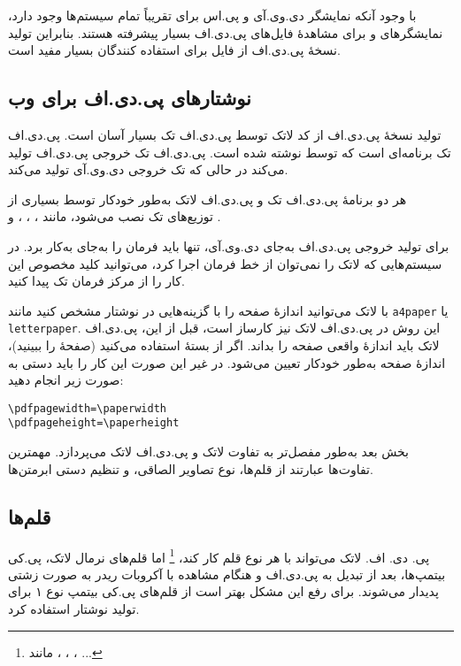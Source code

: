 {با وجود آنکه نمایشگر دی.وی.آی و پی.اس برای تقریباً تمام سیستم‌ها وجود دارد، نمایشگر\-های 
 و   برای مشاهدهٔ فایل‌های پی.دی.اف بسیار پیشرفته هستند. بنابر\-این تولید نسخهٔ پی.دی.اف از فایل برای استفاده کنندگان بسیار مفید است.
\subsection{نوشتارهای پی.دی.اف برای وب}

تولید نسخهٔ پی.دی.اف از کد لاتک توسط پی.دی.اف تک بسیار آسان است. پی.دی.اف تک برنامه‌ای است که توسط  نوشته شده است. پی.دی.اف تک خروجی پی.دی.اف تولید می‌کند در حالی که تک خروجی دی.وی.آی تولید می‌کند. 

هر دو برنامهٔ پی.دی.اف تک و پی.دی.اف لاتک به‌طور خودکار توسط بسیاری از توزیع‌های تک نصب می‌شود، مانند  ، ، 
،  و .

برای تولید خروجی پی.دی.اف به‌جای دی.وی.آی، تنها باید فرمان   را به‌جای  به‌کار برد. 
در سیستم‌هایی که لاتک را نمی‌توان از خط فرمان اجرا کرد، می‌توانید کلید مخصوص این کار را از مرکز فرمان تک پیدا کنید.

با لاتک می‌توانید اندازهٔ صفحه را با گزینه‌هایی در نوشتار‌ مشخص کنید مانند  \texttt{a4paper} یا \texttt{letterpaper}. 
این روش در پی.دی.اف لاتک نیز کارساز است، قبل از این، پی.دی.اف لاتک باید اندازهٔ واقعی صفحه را بداند.
اگر از بستهٔ  استفاده می‌کنید (صفحهٔ 
\pageref{ssec:pdfhyperref} را ببینید)، اندازهٔ صفحه به‌طور خودکار تعیین می‌شود. در غیر این صورت این کار را باید دستی به صورت زیر انجام دهید:
\begin{code}
\begin{verbatim}
\pdfpagewidth=\paperwidth
\pdfpageheight=\paperheight
\end{verbatim}
\end{code}

بخش بعد به‌طور مفصل‌تر به تفاوت لاتک و پی.دی.اف لاتک می‌پردازد. مهمترین تفاوت‌ها عبارتند از قلم‌ها، نوع تصاویر الصاقی، و تنظیم دستی ابرمتن‌ها.

\subsection{قلم‌ها}

{پی. دی. اف. لاتک }
می‌تواند با هر نوع قلم کار کند،%
\footnote{مانند ، ، ، ...} 
اما قلم‌های نرمال لاتک، پی.کی بیتمپ‌ها، بعد از  تبدیل به پی.دی.اف و هنگام مشاهده با آکروبات ریدر به صورت زشتی پدیدار می‌شوند. برای رفع این مشکل بهتر است از قلم‌های پی.کی بیتمپ نوع ۱ برای تولید نوشتار‌‌ استفاده کرد.  


}

